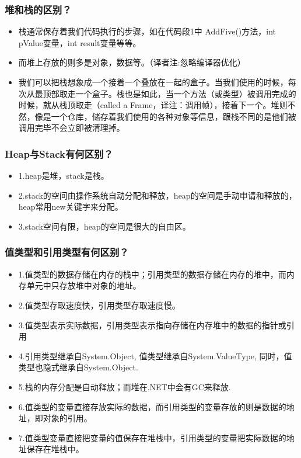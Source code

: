 \documentclass[9pt, b5paper]{article}
\begin{document}
\subsubsection{堆和栈的区别？}
\label{sec:orgcbcdc06}
\begin{itemize}
\item 栈通常保存着我们代码执行的步骤，如在代码段1中 AddFive()方法，int pValue变量，int result变量等等。
\item 而堆上存放的则多是对象，数据等。（译者注:忽略编译器优化）
\item 我们可以把栈想象成一个接着一个叠放在一起的盒子。当我们使用的时候，每次从最顶部取走一个盒子。栈也是如此，当一个方法（或类型）被调用完成的时候，就从栈顶取走（called a Frame，译注：调用帧），接着下一个。堆则不然，像是一个仓库，储存着我们使用的各种对象等信息，跟栈不同的是他们被调用完毕不会立即被清理掉。
\end{itemize}
\subsubsection{Heap与Stack有何区别？}
\label{sec:org514316c}
\begin{itemize}
\item 1.heap是堆，stack是栈。
\item 2.stack的空间由操作系统自动分配和释放，heap的空间是手动申请和释放的，heap常用new关键字来分配。
\item 3.stack空间有限，heap的空间是很大的自由区。
\end{itemize}

\subsubsection{值类型和引用类型有何区别？}
\label{sec:org5199391}
\begin{itemize}
\item 1.值类型的数据存储在内存的栈中；引用类型的数据存储在内存的堆中，而内存单元中只存放堆中对象的地址。
\item 2.值类型存取速度快，引用类型存取速度慢。
\item 3.值类型表示实际数据，引用类型表示指向存储在内存堆中的数据的指针或引用
\item 4.引用类型继承自System.Object, 值类型继承自System.ValueType, 同时，值类型也隐式继承自System.Object.
\item 5.栈的内存分配是自动释放；而堆在.NET中会有GC来释放.
\item 6.值类型的变量直接存放实际的数据，而引用类型的变量存放的则是数据的地址，即对象的引用。
\item 7.值类型变量直接把变量的值保存在堆栈中，引用类型的变量把实际数据的地址保存在堆栈中。
\end{itemize}
\end{document}
